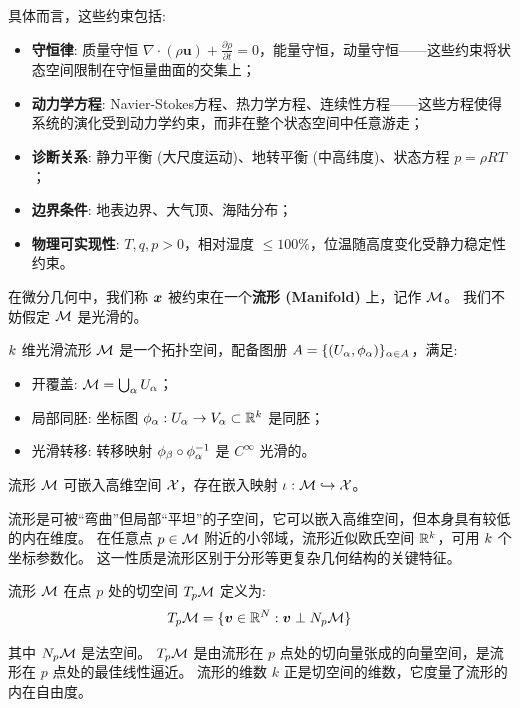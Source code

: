具体而言，这些约束包括:
\begin{itemize}
    \item \textbf{守恒律}: 质量守恒 $\nabla \cdot (\rho \bm{u}) + \frac{\partial \rho}{\partial t} = 0$，能量守恒，动量守恒——这些约束将状态空间限制在守恒量曲面的交集上；
    \item \textbf{动力学方程}: Navier-Stokes方程、热力学方程、连续性方程——这些方程使得系统的演化受到动力学约束，而非在整个状态空间中任意游走；
    \item \textbf{诊断关系}: 静力平衡 (大尺度运动)、地转平衡 (中高纬度)、状态方程 $p = \rho R T$；
    \item \textbf{边界条件}: 地表边界、大气顶、海陆分布；
    \item \textbf{物理可实现性}: $T, q, p > 0$，相对湿度 $\leq 100\%$，位温随高度变化受静力稳定性约束。
\end{itemize}

在微分几何中，我们称 $\bm{x}$ 被约束在一个\textbf{流形 (Manifold)} 上，记作 $\mathcal{M}$。
我们不妨假定 $\mathcal{M}$ 是光滑的。

\begin{definition}[光滑流形]
\label{def:manifold}
    $k$ 维光滑流形 $\mathcal{M}$ 是一个拓扑空间，配备图册 $A = \{(U_\alpha, \phi_\alpha)\}_{\alpha \in A}$，满足:
    \begin{itemize}
        \item 开覆盖: $\mathcal{M} = \bigcup_{\alpha} U_\alpha$；
        \item 局部同胚: 坐标图 $\phi_\alpha: U_\alpha \to V_\alpha \subset \mathbb{R}^{k}$ 是同胚；
        \item 光滑转移: 转移映射 $\phi_\beta \circ \phi_\alpha^{-1}$ 是 $C^\infty$ 光滑的。
    \end{itemize}

    流形 $\mathcal{M}$ 可嵌入高维空间 $\mathcal{X}$，存在嵌入映射 $\iota: \mathcal{M} \hookrightarrow \mathcal{X}$。
\end{definition}

流形是可被“弯曲”但局部“平坦”的子空间，它可以嵌入高维空间，但本身具有较低的内在维度。
在任意点 $p \in \mathcal{M}$ 附近的小邻域，流形近似欧氏空间 $\mathbb{R}^{k}$，可用 $k$ 个坐标参数化。
这一性质是流形区别于分形等更复杂几何结构的关键特征。

\begin{definition}[切空间与流形维度]
\label{def:tangent_space}
    流形 $\mathcal{M}$ 在点 $p$ 处的切空间 $T_p\mathcal{M}$ 定义为:
    \begin{equation}
    \label{eq:tangent_space}
        T_p\mathcal{M} = \{\bm{v} \in \mathbb{R}^N : \bm{v} \perp N_p\mathcal{M}\}
    \end{equation}

    其中 $N_p\mathcal{M}$ 是法空间。
    $T_p\mathcal{M}$ 是由流形在 $p$ 点处的切向量张成的向量空间，是流形在 $p$ 点处的最佳线性逼近。
    流形的维数 $k$ 正是切空间的维数，它度量了流形的内在自由度。
\end{definition}

